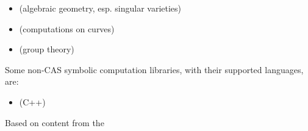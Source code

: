 \documentclass[12pt]{article}
\begin{document}
\begin{itemize}

\item {} (algebraic geometry, esp. singular varieties)
\item {} (computations on curves)
\item {} (group theory)

\end{itemize}

Some non-CAS symbolic computation libraries, with their supported languages, are:

\begin{itemize}
\item {} (C++)
\end{itemize}

\begin{thebibliography}{3}

 Based on content from the 

\end{thebibliography}
\end{document}
